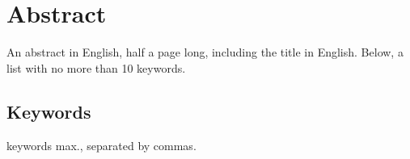 \chapter*{Abstract}


An abstract in English, half a page long, including the title in English. Below, a list with no more than 10 keywords.


\section*{Keywords}

 keywords max., separated by commas.



